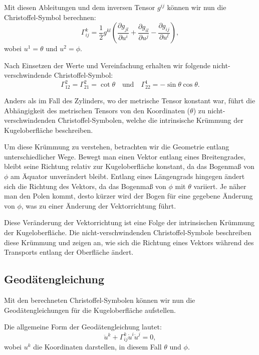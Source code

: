Mit diesen Ableitungen und dem inversen Tensor $g^{ij}$ können wir nun die Christoffel-Symbol berechnen:
\begin{equation}
	\Gamma_{ij}^k = \frac{1}{2} g^{kl} \left( \frac{\partial g_{jl}}{\partial u^i} + \frac{\partial g_{il}}{\partial u^j} - \frac{\partial g_{ij}}{\partial u^l} \right),
\end{equation}
wobei $u^1 = \theta$ und $u^2 = \phi$.

Nach Einsetzen der Werte und Vereinfachung erhalten wir folgende nicht-verschwindende Christoffel-Symbol:
\begin{equation}
	\Gamma_{12}^2 = \Gamma_{21}^2 = \cot\theta \quad \text{und} \quad \Gamma_{22}^1 = -\sin\theta \cos\theta.
\end{equation}

Anders als im Fall des Zylinders, wo der metrische Tensor konstant war, führt die Abhängigkeit des metrischen Tensors von den Koordinaten ($\theta$) zu nicht-verschwindenden Christoffel-Symbolen, welche die intrinsische Krümmung der Kugeloberfläche beschreiben.

Um diese Krümmung zu verstehen, betrachten wir die Geometrie entlang unterschiedlicher Wege.
Bewegt man einen Vektor entlang eines Breitengrades, bleibt seine Richtung relativ zur Kugeloberfläche konstant, da das Bogenmaß von $\phi$ am Äquator unverändert bleibt.
Entlang eines Längengrads hingegen ändert sich die Richtung des Vektors, da das Bogenmaß von $\phi$ mit $\theta$ variiert.
Je näher man den Polen kommt, desto kürzer wird der Bogen für eine gegebene Änderung von $\phi$, was zu einer Änderung der Vektorrichtung führt.

Diese Veränderung der Vektorrichtung ist eine Folge der intrinsischen Krümmung der Kugeloberfläche.
Die nicht-verschwindenden Christoffel-Symbole beschreiben diese Krümmung und zeigen an, wie sich die Richtung eines Vektors während des Transports entlang der Oberfläche ändert.

\subsection{Geodätengleichung}
Mit den berechneten Christoffel-Symbolen können wir nun die Geodätengleichungen für die Kugeloberfläche aufstellen.

Die allgemeine Form der Geodätengleichung lautet:
\begin{equation}
	\ddot{u}^k + \Gamma^k_{ij} \dot{u}^i \dot{u}^j = 0,
\end{equation}
wobei $u^k$ die Koordinaten darstellen, in diesem Fall $\theta$ und $\phi$.

